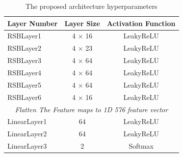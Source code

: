 \begin{table}[htbp]
\caption{The proposed architecture hyperparameters}
\begin{center}

\begin{tabular}{|l|c|c|}
\hline
\textbf{Layer Number} & \textbf{Layer Size} & \textbf{Activation Function} \\
\hline
\hline
RSBLayer1 & 4 $\times$ 16 & LeakyReLU\\
\hline
RSBLayer2 & 4 $\times$ 23 & LeakyReLU\\
\hline
RSBLayer3 & 4 $\times$ 64 & LeakyReLU\\
\hline
RSBLayer4 & 4 $\times$ 64 & LeakyReLU\\
\hline
RSBLayer5 & 4 $\times$ 64 & LeakyReLU\\
\hline
RSBLayer6 & 4 $\times$ 16 & LeakyReLU\\
\hline
\multicolumn{3}{|c|}{\textit{Flatten The Feature maps to 1D 576 feature  vector}}\\
\cline{1-3}
LinearLayer1 & 64 & LeakyReLU\\
\hline
LinearLayer2 & 64 & LeakyReLU\\
\hline
LinearLayer3 & 2 & Softmax\\
\hline
\end{tabular}
\label{lyrSpec}
\end{center}
\end{table}


